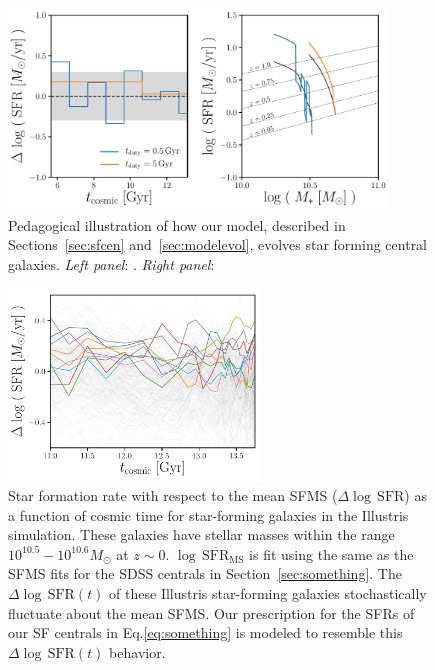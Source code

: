 \documentclass[12pt, letterpaper, preprint]{aastex}
\newcommand{\logsfr}{\log \, \mathrm{SFR}}
\newcommand{\musfms}{\log\,\overline{\mathrm{SFR}}_\mathrm{MS}}
\begin{document}
\begin{figure}
\begin{center}
\includegraphics[width=0.9\textwidth]{figs/sfh_pedagogical.pdf}
    \caption{Pedagogical illustration of how our model, described in Sections~\ref{sec:sfcen} 
    and~\ref{sec:modelevol}, evolves star forming central galaxies.
    \emph{Left panel}: . 
    \emph{Right panel}:}
\label{fig:sfh_model}
\end{center}
\end{figure}

\begin{figure}
\begin{center}
\includegraphics[width=0.6\textwidth]{figs/illustris_sfh.pdf} 
    \caption{Star formation rate with respect to the mean SFMS ($\Delta \logsfr$) as 
    a function of cosmic time for star-forming galaxies in the Illustris simulation. 
    These galaxies have stellar masses within the range $10^{10.5}-10^{10.6}M_\odot$ 
    at $z\sim0$. $\musfms$ is fit using the same as the SFMS fits for the SDSS 
    centrals in Section~\ref{sec:something}. The $\Delta \logsfr(t)$ of these Illustris 
    star-forming galaxies stochastically fluctuate about the mean SFMS. Our prescription 
    for the SFRs of our SF centrals in Eq.\ref{eq:something} is modeled to resemble this
    $\Delta \logsfr(t)$ behavior.}
\label{fig:illsfh}
\end{center}
\end{figure}
\end{document}
